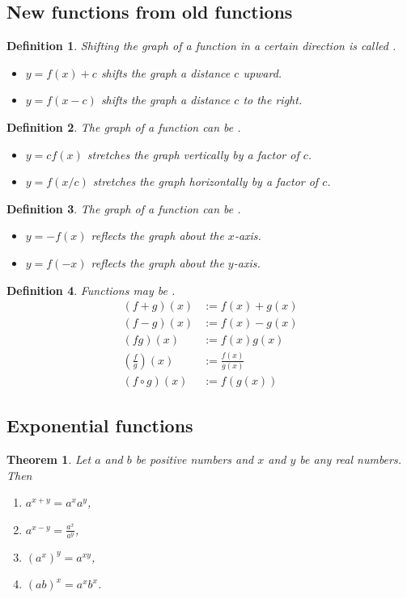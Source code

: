 \documentclass{article}
\theoremstyle{sltheorem}
\newtheorem{definition}{Definition}[section]
\newtheorem{theorem}{Theorem}[section]
\begin{document}
\subsection{New functions from old functions}
\begin{definition}
    Shifting the graph of a function in a certain direction is called .
    \begin{itemize}
        \item $y = f(x) + c$ shifts the graph a distance $c$ upward.
        \item $y= f(x - c)$ shifts the graph a distance $c$ to the right.
    \end{itemize}
\end{definition}
\begin{definition}
    The graph of a function can be . 
    \begin{itemize}
        \item $y=cf(x)$ stretches the graph vertically by a factor of $c$.
        \item $y=f(x/c)$ stretches the graph horizontally by a factor of $c$.
    \end{itemize}
\end{definition}
\begin{definition}
    The graph of a function can be .
    \begin{itemize}
        \item $y=-f(x)$ reflects the graph about the $x$-axis.
        \item $y=f(-x)$ reflects the graph about the $y$-axis.
    \end{itemize}
\end{definition}
\begin{definition}
    Functions may be .
    \begin{align*}
        (f+g)(x) &:= f(x) + g(x)\\
        (f-g)(x) &:= f(x) - g(x)\\
        (fg)(x) &:= f(x)g(x)\\
        (\frac{f}{g})(x)&:=\frac{f(x)}{g(x)}\\
        (f\circ g)(x) &:= f(g(x))
    \end{align*}
\end{definition}
\setcounter{subsection}{4}
\subsection{Exponential functions}
\begin{theorem}
    Let $a$ and $b$ be positive numbers and $x$ and $y$ be any real numbers. Then
    \begin{enumerate}
        \item $a^{x+y}=a^xa^y$,
        \item $a^{x-y}=\frac{a^x}{a^y}$,
        \item $(a^x)^y=a^{xy}$,
        \item $(ab)^x=a^xb^x$.
    \end{enumerate}
\end{theorem}
\end{document}
